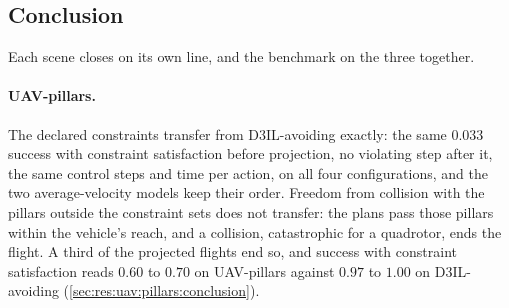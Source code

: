 
\subsection{Conclusion}\label{sec:res:uav:conclusion}

Each scene closes on its own line, and the benchmark on the three together.

\paragraph{UAV-pillars.} The declared constraints transfer from D3IL-avoiding exactly: the same $0.033$
success with constraint satisfaction before projection, no violating step after it, the same control steps
and time per action, on all four configurations, and the two average-velocity models keep their order.
Freedom from collision with the pillars outside the constraint sets does not transfer: the plans pass
those pillars within the vehicle's reach, and a collision, catastrophic for a quadrotor, ends the flight. A
third of the projected flights end so, and success with constraint satisfaction reads $0.60$ to $0.70$ on
UAV-pillars against $0.97$ to $1.00$ on D3IL-avoiding (\autoref{sec:res:uav:pillars:conclusion}).

